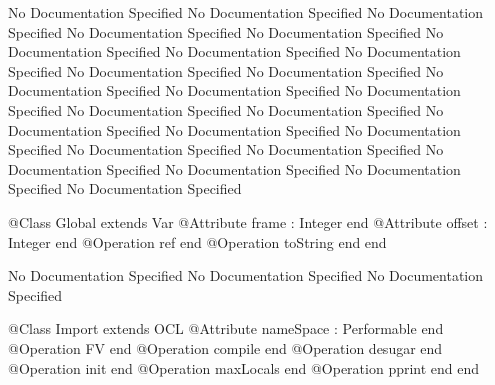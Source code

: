 No Documentation Specified
No Documentation Specified
No Documentation Specified
No Documentation Specified
No Documentation Specified
No Documentation Specified
No Documentation Specified
No Documentation Specified
No Documentation Specified
No Documentation Specified
No Documentation Specified
No Documentation Specified
No Documentation Specified
No Documentation Specified
No Documentation Specified
No Documentation Specified
No Documentation Specified
No Documentation Specified
No Documentation Specified
No Documentation Specified
No Documentation Specified
No Documentation Specified
No Documentation Specified
No Documentation Specified
\begin{Interface}
@Class Global extends Var
  @Attribute frame : Integer end
  @Attribute offset : Integer end
  @Operation ref end
  @Operation toString end
end
\end{Interface}
No Documentation Specified
No Documentation Specified
No Documentation Specified
\begin{Interface}
@Class Import extends OCL
  @Attribute nameSpace : Performable end
  @Operation FV end
  @Operation compile end
  @Operation desugar end
  @Operation init end
  @Operation maxLocals end
  @Operation pprint end
end
\end{Interface}

